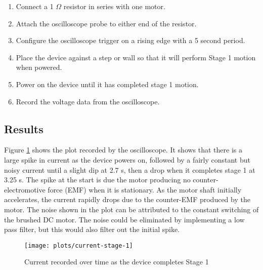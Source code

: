 \begin{enumerate}
	\item Connect a 1 $\Omega$ resistor in series with one motor.
	\item Attach the oscilloscope probe to either end of the resistor.
	\item Configure the oscilloscope trigger on a rising edge with a 5 second period.
	\item Place the device against a step or wall so that it will perform Stage 1 motion when powered.
	\item Power on the device until it has completed stage 1 motion.
	\item Record the voltage data from the oscilloscope.
\end{enumerate}

\subsection{Results}

Figure \ref{fig:current-stage-1} shows the plot recorded by the oscilloscope. It shows that there is a large spike in current as the device powers on, followed by a fairly constant but noisy current until a slight dip at 2.7 s, then a drop when it completes stage 1 at 3.25 s. The spike at the start is due the motor producing no counter-electromotive force (EMF) when it is stationary. As the motor shaft initially accelerates, the current rapidly drops due to the counter-EMF produced by the motor. The noise shown in the plot can be attributed to the constant switching of the brushed DC motor. The noise could be eliminated by implementing a low pass filter, but this would also filter out the initial spike. 
\begin{figure}[h]
	\centering
	\texttt{[image: plots/current-stage-1]}
	\caption{Current recorded over time as the device completes Stage 1}
	\label{fig:current-stage-1}
\end{figure}